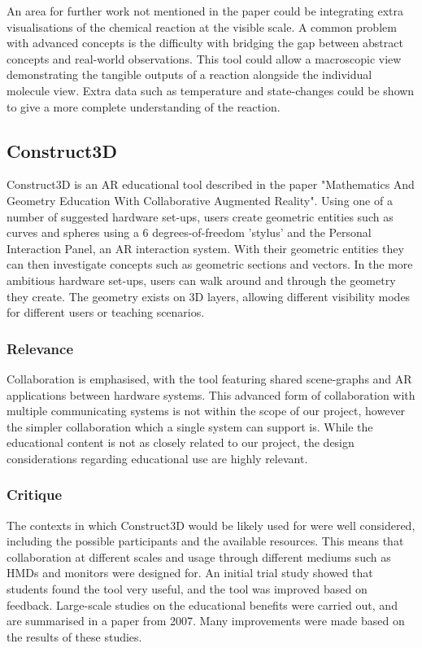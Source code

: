 An area for further work not mentioned in the paper could be integrating extra visualisations of the chemical reaction at the visible scale. A common problem with advanced concepts is the difficulty with bridging the gap between abstract concepts and real-world observations. This tool could allow a macroscopic view demonstrating the tangible outputs of a reaction alongside the individual molecule view. Extra data such as temperature and state-changes could be shown to give a more complete understanding of the reaction.

\subsection{Construct3D}
Construct3D is an AR educational tool described in the paper "Mathematics And Geometry Education With Collaborative Augmented Reality"\cite{Kaufmann03}. Using one of a number of suggested hardware set-ups, users create geometric entities such as curves and spheres using a 6 degrees-of-freedom 'stylus' and the Personal Interaction Panel, an AR interaction system\cite{szal97}. With their geometric entities they can then investigate concepts such as geometric sections and vectors. In the more ambitious hardware set-ups, users can walk around and through the geometry they create. The geometry exists on 3D layers, allowing different visibility modes for different users or teaching scenarios. 

\subsubsection{Relevance}
Collaboration is emphasised, with the tool featuring shared scene-graphs and AR applications between hardware systems. This advanced form of collaboration with multiple communicating systems is not within the scope of our project, however the simpler collaboration which a single system can support is. While the educational content is not as closely related to our project, the design considerations regarding educational use are highly relevant.

\subsubsection{Critique}
The contexts in which Construct3D would be likely used for were well considered, including the possible participants and the available resources. This means that collaboration at different scales and usage through different mediums such as HMDs and monitors were designed for. An initial trial study showed that students found the tool very useful, and the tool was improved based on feedback. Large-scale studies on the educational benefits were carried out, and are summarised in a paper from 2007\cite{Kaufmann07}. Many improvements were made based on the results of these studies.


